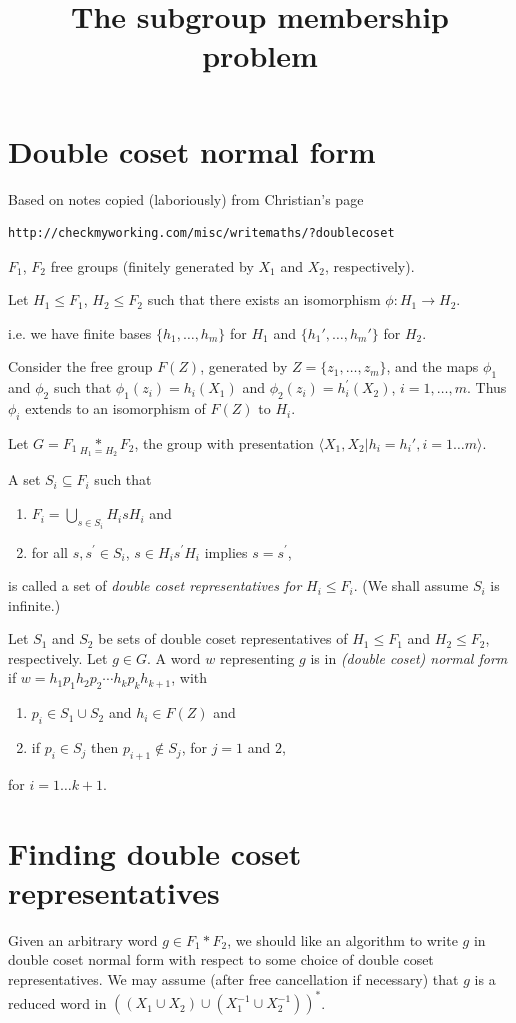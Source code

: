\documentclass[a4paper,12pt]{article}
\title{The subgroup membership problem
}
\author{ 
}
\numberwithin{equation}{section}
\numberwithin{figure}{section}
\newcommand{\la}{\langle}
\newcommand{\ra}{\rangle}
\newcommand{\be}{\begin{enumerate}}
\newcommand{\ee}{\end{enumerate}}
\begin{document}
\maketitle
\section{Double coset normal form}
Based on notes copied (laboriously) from Christian's page 
\begin{verbatim}
http://checkmyworking.com/misc/writemaths/?doublecoset
\end{verbatim}
$F_1$, $F_2$ free groups (finitely generated by $X_1$ 
and $X_2$, respectively).

Let $H_1 \leq F_1$, $H_2 \leq F_2$ such that 
there exists an isomorphism $\phi: H_1 \rightarrow H_2$.

i.e. we have finite bases $\{h_1, \ldots, h_m \}$  for $H_1$ and 
$\{h_1', \ldots, h_m'\}$ for $H_2$.

Consider the free group $F(Z)$, generated by $Z=\{z_1, \ldots, z_m\}$, 
and the maps $\phi_1$ and $\phi_2$ such that 
$\phi_1(z_i)=h_i(X_1)  $ and  $\phi_2(z_i)=h^\prime_i(X_2)$, $i=1,\ldots ,m$.
Thus $\phi_i$ extends to an isomorphism of $F(Z)$ to $H_i$. 

Let ${G = F_1 \underset{H_1=H_2}{\ast} F_2}$, the group with  
 presentation $\la X_1,X_2 | h_i = h_i', i=1 \ldots m\ra$.

A  set $S_i \subseteq F_i$ such that
\be 
\item
$F_i = \displaystyle{\bigcup_{s \in S_i} H_isH_i}$ 
and 
\item
for all $s, s^\prime \in S_i$, $s\in H_i s^\prime H_i$ 
implies $s=s^\prime$,
\ee
is called a set of \emph{double coset representatives for} $H_i\le F_i$. 
(We shall assume $S_i$ is infinite.) 

Let $S_1$ and $S_2$ be sets of  double coset representatives of 
$H_1\le F_1$ and $H_2\le F_2$, respectively. Let $g \in G$. 
A word $w$ representing $g$ is in \emph{(double coset) normal form} if 
$w = h_{1}p_1h_{2}p_2 \cdots h_{k}p_kh_{{k+1}}$, with
\be
\item $p_i \in S_1\cup S_2$  and $h_i \in F(Z)$ and
\item if $p_i\in S_j$ then $p_{i+1}\notin S_j$, for $j=1$ and $2$,
\ee
for $i = 1 \ldots k+1$.
\section{Finding double coset representatives}

Given an arbitrary word $g\in F_1\ast F_2$,  
we should like an algorithm to write $g$ in double coset normal form
with respect to some choice of double coset representatives. We may 
assume (after free cancellation if necessary) that $g$ is a 
reduced word in $((X_1\cup X_2)\cup ( X_1^{-1}\cup X_2^{-1}))^\ast$.
 
\end{document}
